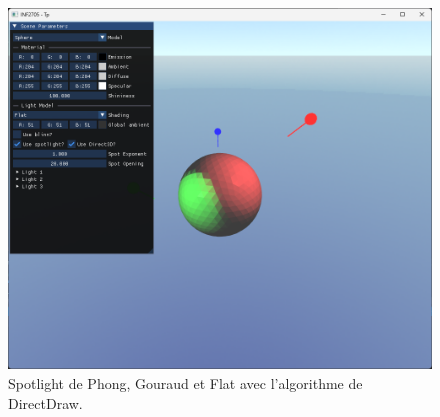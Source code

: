 \documentclass{article}[letterpaper, 11pt]
\begin{document}
\begin{figure}[h]
\begin{minipage}[c]{.33\linewidth}
		\centering
		\includegraphics[scale = 0.16]{image_14.png}
  \end{minipage}
		 \caption{ \centering Spotlight de Phong, Gouraud et Flat avec l'algorithme de DirectDraw.}
\end{figure}
\end{document}
